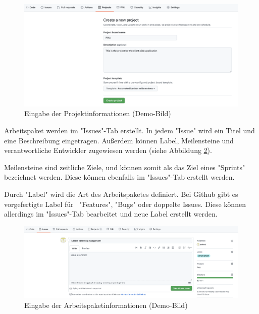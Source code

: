 \begin{figure}[H]
    \centering
    \includegraphics[width=\textwidth]{media/ProjectManagement/EnterProjectInfo.png}
    \caption{Eingabe der Projektinformationen (Demo-Bild)}
    \label{fig:enterProjectInfo}
\end{figure}


Arbeitspaket werden im "Issues"-Tab erstellt. In jedem "Issue" wird ein Titel und eine Beschreibung eingetragen. Außerdem können Label, Meilensteine und verantwortliche Entwickler zugewiesen werden (siehe Abbildung \ref{fig:createIssue}). 

Meilensteine sind zeitliche Ziele, und können somit als das Ziel eines "Sprints" bezeichnet werden. Diese können ebenfalls im "Issues"-Tab erstellt werden.

Durch "Label" wird die Art des Arbeitspaketes definiert. Bei Github gibt es vorgefertigte Label für \zb\ "Features", "Bugs" oder doppelte Issues. Diese können allerdings im "Issues"-Tab bearbeitet und neue Label erstellt werden.

\begin{figure}[H]
    \centering
    \includegraphics[width=\textwidth]{media/ProjectManagement/CreateIssue.png}
    \caption{Eingabe der Arbeitspaketinformationen (Demo-Bild)}
    \label{fig:createIssue}
\end{figure}


